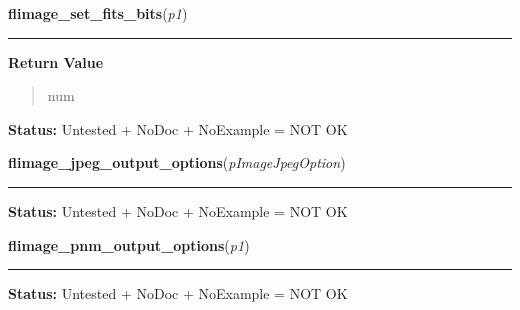     \vspace{0.5ex}

\hspace{.8\funcindent}\begin{boxedminipage}{\funcwidth}

    \raggedright \textbf{flimage\_set\_fits\_bits}(\textit{p1})

    \vspace{-1.5ex}

    \rule{\textwidth}{0.5\fboxrule}
\setlength{\parskip}{2ex}
\setlength{\parskip}{1ex}
      \textbf{Return Value}
    \vspace{-1ex}

      \begin{quote}
      num

      \end{quote}

\textbf{Status:} Untested + NoDoc + NoExample = NOT OK



    \end{boxedminipage}

    \label{xformslib:library:flimage_jpeg_output_options}

    \vspace{0.5ex}

\hspace{.8\funcindent}\begin{boxedminipage}{\funcwidth}

    \raggedright \textbf{flimage\_jpeg\_output\_options}(\textit{pImageJpegOption})

    \vspace{-1.5ex}

    \rule{\textwidth}{0.5\fboxrule}
\setlength{\parskip}{2ex}
\setlength{\parskip}{1ex}
\textbf{Status:} Untested + NoDoc + NoExample = NOT OK



    \end{boxedminipage}

    \label{xformslib:library:flimage_pnm_output_options}

    \vspace{0.5ex}

\hspace{.8\funcindent}\begin{boxedminipage}{\funcwidth}

    \raggedright \textbf{flimage\_pnm\_output\_options}(\textit{p1})

    \vspace{-1.5ex}

    \rule{\textwidth}{0.5\fboxrule}
\setlength{\parskip}{2ex}
\setlength{\parskip}{1ex}
\textbf{Status:} Untested + NoDoc + NoExample = NOT OK



    \end{boxedminipage}

